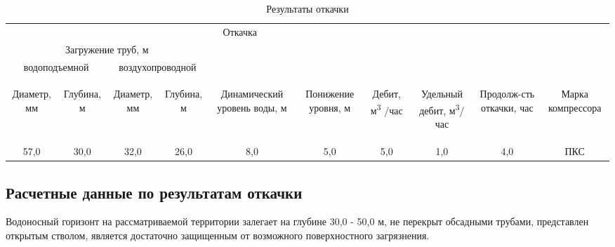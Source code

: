 \documentclass[a4paper,12pt]{article} %
\newcommand{\txtDepth}{50,0}					%
\newcommand{\txtDebit}{5,0}						%
\newcommand{\txtHorizDepth}{30,0}				%
\newcommand{\txtPumpResults}{
57,0 & 		%
30,0 & 		%
32,0 & 		%
26,0 &		%
8,0  & 		%
5,0  &		%
\txtDebit & %
1,0  &		%
4,0  &		%
ПКС			%
}			%
\begin{document}
\begin{table}[!h]
	\caption{Результаты откачки}
	\centering\begin{tabular}{|c|c|c|c|c|c|c|c|c|c|}
	\hline 
	\multicolumn{8}{|c|}{Откачка}&  &  \\ 
	\cline{1-8} 
	\multicolumn{4}{|c|}{Загружение труб, м} &  &  &  &  &  &  \\ 
	\cline{1-4} 
	\multicolumn{2}{|c|}{водоподъемной} & \multicolumn{2}{c|}{воздухопроводной} &  &  &  &  &  & \\ 
	\cline{1-4} 
	\begin{sideways}Диаметр, мм\end{sideways} &
	\begin{sideways}Глубина, м\end{sideways} &
	\begin{sideways}Диаметр, мм\end{sideways} &
	\begin{sideways}Глубина, м\end{sideways} &
	\begin{sideways}Динамический уровень воды, м\end{sideways} &
	\begin{sideways}Понижение уровня, м\end{sideways} &
	\begin{sideways}Дебит, м\textsuperscript{3} /час\end{sideways} &
	\begin{sideways}Удельный дебит, м\textsuperscript{3}/час \end{sideways} &
	\begin{sideways}Продолж-сть откачки, час\end{sideways} &
	\begin{sideways}Марка компрессора\end{sideways} \\ 
	\hline 
	\txtPumpResults \\ 
	\hline 
\end{tabular} 
\end{table}

\subsection*{Расчетные данные по результатам откачки}

Водоносный горизонт на рассматриваемой территории залегает на глубине 	{\txtHorizDepth} - {\txtDepth}	м, не перекрыт обсадными трубами, представлен открытым стволом, является достаточно защищенным от возможного поверхностного загрязнения.
\end{document}
